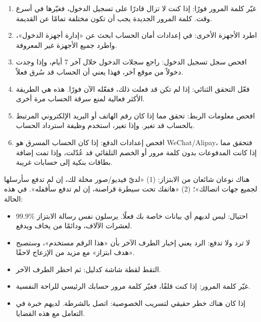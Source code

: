 
\begin{enumerate}
  \item غيّر كلمة المرور فورًا: إذا كنت لا تزال قادرًا على تسجيل الدخول، فغيّرها في أسرع وقت. كلمة المرور الجديدة يجب أن تكون مختلفة تمامًا عن القديمة.
  \item اطرد الأجهزة الأخرى: في إعدادات أمان الحساب ابحث عن «إدارة أجهزة الدخول»، واطرد جميع الأجهزة غير المعروفة.
  \item افحص سجل تسجيل الدخول: راجع سجلات الدخول خلال آخر 7 أيام، وإذا وجدت دخولاً من موقع آخر، فهذا يعني أن الحساب قد سُرق فعلاً.
  \item فعّل التحقق الثنائي: إذا لم تكن قد فعلت ذلك، ففعّله الآن فورًا. هذه هي الطريقة الأكثر فعالية لمنع سرقة الحساب مرة أخرى.
  \item افحص معلومات الربط: تحقق مما إذا كان رقم الهاتف أو البريد الإلكتروني المرتبط بالحساب قد تغير. وإذا تغير، استخدم وظيفة استرداد الحساب.
  \item افحص إعدادات الدفع: إذا كان الحساب المسرق هو WeChat/Alipay، فتحقق مما إذا كانت المدفوعات بدون كلمة مرور أو الخصم التلقائي قد عُدّلت، وإذا تمت إضافة بطاقات بنكية إلى حسابات غريبة.
\end{enumerate}


هناك نوعان شائعان من الابتزاز: (1) «لديّ فيديو/صور مخلة لك، إن لم تدفع سأرسلها لجميع جهات اتصالك»؛ (2) «هاتفك تحت سيطرة قراصنة، إن لم تدفع سأقفله». في هذه الحالة:

\begin{itemize}
  \item 99.9\% احتيال: ليس لديهم أي بيانات خاصة بك فعلًا. يرسلون نفس رسالة الابتزاز لعشرات الآلاف، ودائمًا من يخاف ويدفع.
  \item لا ترد ولا تدفع: الرد يعني إخبار الطرف الآخر بأن «هذا الرقم مستخدم»، وستصبح «هدف ابتزاز» مع مزيد من الإزعاج لاحقًا.
  \item التقط لقطة شاشة كدليل: ثم احظر الطرف الآخر.
  \item غيّر كلمة المرور: إذا كنت قلقًا، فغيّر كلمة مرور حسابك الرئيسي للراحة النفسية.
  \item إذا كان هناك خطر حقيقي لتسريب الخصوصية: اتصل بالشرطة. لديهم خبرة في التعامل مع هذه القضايا.
\end{itemize}


